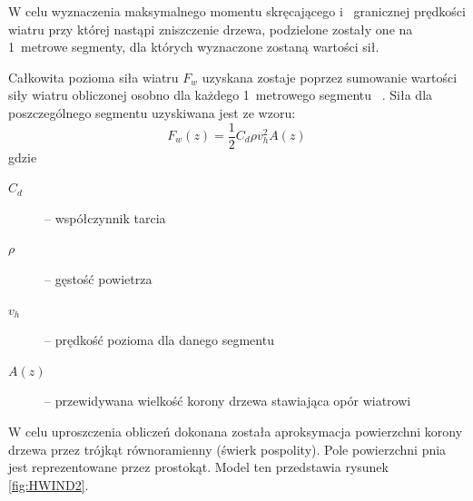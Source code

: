 W celu wyznaczenia maksymalnego momentu skręcającego i ~granicznej prędkości wiatru przy której nastąpi zniszczenie drzewa, podzielone zostały one na 1~metrowe segmenty, dla których wyznaczone zostaną wartości sił.

Całkowita pozioma siła wiatru $F_w$ uzyskana zostaje poprzez sumowanie wartości siły wiatru obliczonej osobno dla każdego 1~metrowego segmentu ~\cite{chm_mgza}. Siła dla poszczególnego segmentu uzyskiwana jest ze wzoru:
$$ F_w(z) = \frac{1}{2}C_d  \rho v_h^2 A(z) $$ 
gdzie

\begin{description}
  \item[$C_d$] -- współczynnik tarcia
  \item[$\rho$ ]-- gęstość powietrza
  \item[$v_h$ ]-- prędkość pozioma dla danego segmentu
  \item[$A(z)$]-- przewidywana wielkość korony drzewa stawiająca opór wiatrowi
\end{description}

W celu uproszczenia obliczeń dokonana została aproksymacja powierzchni korony drzewa przez trójkąt równoramienny (świerk pospolity). Pole powierzchni pnia jest reprezentowane przez prostokąt. Model ten przedstawia rysunek \ref{fig:HWIND2}.

